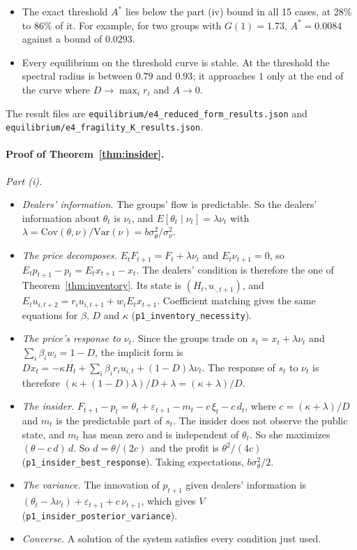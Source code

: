 \documentclass[12pt]{article}
\theoremstyle{definition}
\theoremstyle{remark}
\begin{document}
\begin{itemize}[itemsep=1pt,topsep=2pt]
\item The exact threshold $A^*$ lies below the part (iv) bound in all 15 cases, at 28\% to 86\% of it. For example, for two groups with $G(1)=1.73$, $A^*=0.0084$ against a bound of $0.0293$.
\item Every equilibrium on the threshold curve is stable. At the threshold the spectral radius is between $0.79$ and $0.93$; it approaches $1$ only at the end of the curve where $D\to\max_ir_i$ and $A\to0$.
\end{itemize}
The result files are \nolinkurl{equilibrium/e4_reduced_form_results.json} and \nolinkurl{equilibrium/e4_fragility_K_results.json}.

\paragraph{Proof of Theorem~\ref{thm:insider}.}
\emph{Part (i).}
\begin{itemize}[itemsep=1pt,topsep=2pt]
\item \emph{Dealers' information.} The groups' flow is predictable. So the dealers' information about $\theta_t$ is $\nu_t$, and $E[\theta_t\mid\nu_t]=\lambda\nu_t$ with $\lambda=\mathrm{Cov}(\theta,\nu)/\mathrm{Var}(\nu)=b\sigma_\theta^2/\sigma_\nu^2$.
\item \emph{The price decomposes.} $E_tF_{t+1}=F_t+\lambda\nu_t$ and $E_t\nu_{t+1}=0$, so $E_tp_{t+1}-p_t=E_tx_{t+1}-x_t$. The dealers' condition is therefore the one of Theorem~\ref{thm:inventory}. Its state is $(H_t,u_{\cdot,t+1})$, and $E_tu_{i,t+2}=r_iu_{i,t+1}+w_iE_tx_{t+1}$. Coefficient matching gives the same equations for $\beta$, $D$ and $\kappa$ (\nolinkurl{p1_inventory_necessity}).
\item \emph{The price's response to $\nu_t$.} Since the groups trade on $s_t=x_t+\lambda\nu_t$ and $\sum_i\beta_iw_i=1-D$, the implicit form is $Dx_t=-\kappa H_t+\sum_i\beta_ir_iu_{i,t}+(1-D)\lambda\nu_t$. The response of $s_t$ to $\nu_t$ is therefore $(\kappa+(1-D)\lambda)/D+\lambda=(\kappa+\lambda)/D$.
\item \emph{The insider.} $F_{t+1}-p_t=\theta_t+\varepsilon_{t+1}-m_t-c\,\xi_t-c\,d_t$, where $c=(\kappa+\lambda)/D$ and $m_t$ is the predictable part of $s_t$. The insider does not observe the public state, and $m_t$ has mean zero and is independent of $\theta_t$. So she maximizes $(\theta-c\,d)\,d$. So $d=\theta/(2c)$ and the profit is $\theta^2/(4c)$ (\nolinkurl{p1_insider_best_response}). Taking expectations, $b\sigma_\theta^2/2$.
\item \emph{The variance.} The innovation of $p_{t+1}$ given dealers' information is $(\theta_t-\lambda\nu_t)+\varepsilon_{t+1}+c\,\nu_{t+1}$, which gives $V$ (\nolinkurl{p1_insider_posterior_variance}).
\item \emph{Converse.} A solution of the system satisfies every condition just used.
\end{itemize}
\end{document}
